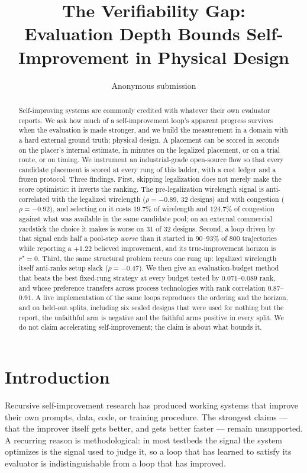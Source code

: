 \documentclass{article}
\title{The Verifiability Gap:\\ Evaluation Depth Bounds Self-Improvement in Physical Design}
\author{Anonymous submission}
\date{}
\begin{document}
\maketitle

\begin{abstract}
Self-improving systems are commonly credited with whatever their own evaluator
reports. We ask how much of a self-improvement loop's apparent progress survives
when the evaluation is made stronger, and we build the measurement in a domain with
a hard external ground truth: physical design. A placement can be scored in seconds
on the placer's internal estimate, in minutes on the legalized placement, or on a
trial route, or on timing. We instrument an industrial-grade open-source flow so
that every candidate placement is scored at every rung of this ladder, with a cost
ledger and a frozen protocol. Three findings. First, skipping legalization does not
merely make the score optimistic: it inverts the ranking. The pre-legalization
wirelength signal is anti-correlated with the legalized wirelength
($\rho=-0.89$, 32 designs) and with congestion ($\rho=-0.92$), and selecting on it
costs $19.7\%$ of wirelength and $124.7\%$ of congestion against what was available
in the same candidate pool; on an external commercial yardstick the choice it makes
is worse on 31 of 32 designs. Second, a loop driven by that signal ends half a
pool-step \emph{worse} than it started in $90$--$93\%$ of 800 trajectories while
reporting a $+1.22$ believed improvement, and its true-improvement horizon is
$r^\star=0$. Third, the same structural problem recurs one rung up: legalized
wirelength itself anti-ranks setup slack ($\rho=-0.47$). We then give an
evaluation-budget method that beats the best fixed-rung strategy at every budget
tested by $0.071$--$0.089$ rank, and whose preference transfers across process
technologies with rank correlation $0.87$--$0.91$. A live implementation of the same
loops reproduces the ordering and the horizon, and on held-out splits, including six
sealed designs that were used for nothing but the report, the unfaithful arm is negative
and the faithful arms positive in every split. We do not claim accelerating
self-improvement; the claim is about what bounds it.
\end{abstract}

\section{Introduction}

Recursive self-improvement research has produced working systems that improve their
own prompts, data, code, or training procedure. The strongest claims --- that the
improver itself gets better, and gets better faster --- remain unsupported. A
recurring reason is methodological: in most testbeds the signal the system optimizes
is the signal used to judge it, so a loop that has learned to satisfy its evaluator
is indistinguishable from a loop that has improved.
\end{document}
